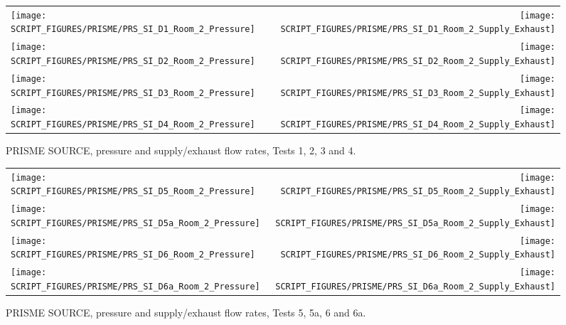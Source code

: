 \newpage

\begin{figure}[p]
\begin{tabular*}{\textwidth}{l@{\extracolsep{\fill}}r}
\texttt{[image: SCRIPT\_FIGURES/PRISME/PRS\_SI\_D1\_Room\_2\_Pressure]} &
\texttt{[image: SCRIPT\_FIGURES/PRISME/PRS\_SI\_D1\_Room\_2\_Supply\_Exhaust]} \\
\texttt{[image: SCRIPT\_FIGURES/PRISME/PRS\_SI\_D2\_Room\_2\_Pressure]} &
\texttt{[image: SCRIPT\_FIGURES/PRISME/PRS\_SI\_D2\_Room\_2\_Supply\_Exhaust]} \\
\texttt{[image: SCRIPT\_FIGURES/PRISME/PRS\_SI\_D3\_Room\_2\_Pressure]} &
\texttt{[image: SCRIPT\_FIGURES/PRISME/PRS\_SI\_D3\_Room\_2\_Supply\_Exhaust]} \\
\texttt{[image: SCRIPT\_FIGURES/PRISME/PRS\_SI\_D4\_Room\_2\_Pressure]} &
\texttt{[image: SCRIPT\_FIGURES/PRISME/PRS\_SI\_D4\_Room\_2\_Supply\_Exhaust]}
\end{tabular*}
\caption[PRISME SOURCE, pressure and supply/exhaust flow rates, Tests 1, 2, 3 and 4]{PRISME SOURCE, pressure and supply/exhaust flow rates, Tests 1, 2, 3 and 4.}
\label{PRISME_SOURCE_Room_2_Pressure_1}
\end{figure}

\begin{figure}[p]
\begin{tabular*}{\textwidth}{l@{\extracolsep{\fill}}r}
\texttt{[image: SCRIPT\_FIGURES/PRISME/PRS\_SI\_D5\_Room\_2\_Pressure]} &
\texttt{[image: SCRIPT\_FIGURES/PRISME/PRS\_SI\_D5\_Room\_2\_Supply\_Exhaust]} \\
\texttt{[image: SCRIPT\_FIGURES/PRISME/PRS\_SI\_D5a\_Room\_2\_Pressure]} &
\texttt{[image: SCRIPT\_FIGURES/PRISME/PRS\_SI\_D5a\_Room\_2\_Supply\_Exhaust]} \\
\texttt{[image: SCRIPT\_FIGURES/PRISME/PRS\_SI\_D6\_Room\_2\_Pressure]} &
\texttt{[image: SCRIPT\_FIGURES/PRISME/PRS\_SI\_D6\_Room\_2\_Supply\_Exhaust]} \\
\texttt{[image: SCRIPT\_FIGURES/PRISME/PRS\_SI\_D6a\_Room\_2\_Pressure]} &
\texttt{[image: SCRIPT\_FIGURES/PRISME/PRS\_SI\_D6a\_Room\_2\_Supply\_Exhaust]}
\end{tabular*}
\caption[PRISME SOURCE, pressure and supply/exhaust flow rates, Tests 5, 5a, 6 and 6a]{PRISME SOURCE, pressure and supply/exhaust flow rates, Tests 5, 5a, 6 and 6a.}
\label{PRISME_SOURCE_Room_2_Pressure_2}
\end{figure}



